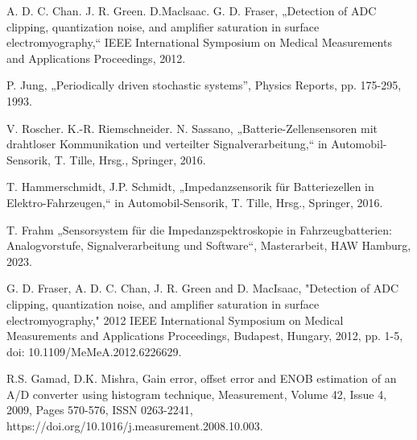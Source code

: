 \begin{thebibliography}{[99]}
	A. D. C. Chan. J. R. Green. D.Maclsaac. G. D. Fraser, „Detection of ADC clipping, quantization noise, and amplifier saturation in surface electromyography,“ IEEE International Symposium on Medical Measurements and Applications Proceedings, 2012.
	
	P. Jung, „Periodically driven stochastic systems”, Physics Reports,  pp. 175-295, 1993.
	
	V. Roscher. K.-R. Riemschneider. N. Sassano, „Batterie-Zellensensoren mit drahtloser Kommunikation und verteilter Signalverarbeitung,“ in Automobil-Sensorik, T. Tille, Hrsg., Springer, 2016.
	
	T. Hammerschmidt, J.P. Schmidt, „Impedanzsensorik für Batteriezellen in Elektro-Fahrzeugen,“ in Automobil-Sensorik, T. Tille, Hrsg., Springer, 2016.
	
	T. Frahm „Sensorsystem für die Impedanzspektroskopie in Fahrzeugbatterien: Analogvorstufe, Signalverarbeitung und Software“, Masterarbeit, HAW Hamburg, 2023.
	
	G. D. Fraser, A. D. C. Chan, J. R. Green and D. MacIsaac, "Detection of ADC clipping, quantization noise, and amplifier saturation in surface electromyography," 2012 IEEE International Symposium on Medical Measurements and Applications Proceedings, Budapest, Hungary, 2012, pp. 1-5, doi: 10.1109/MeMeA.2012.6226629.
	
	R.S. Gamad, D.K. Mishra,
	Gain error, offset error and ENOB estimation of an A/D converter using histogram technique,
	Measurement,
	Volume 42, Issue 4,
	2009,
	Pages 570-576,
	ISSN 0263-2241,
	https://doi.org/10.1016/j.measurement.2008.10.003.
\end{thebibliography}
	

 
 